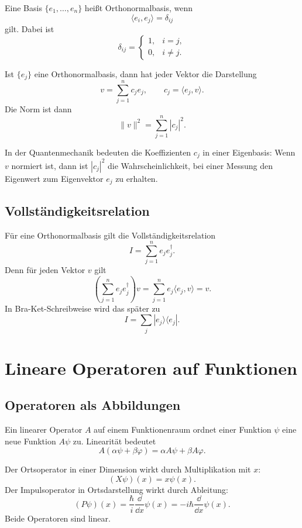 \begin{definitionbox}
Eine Basis $\{e_1,\dots,e_n\}$ heißt Orthonormalbasis, wenn
\[
    \langle e_i,e_j\rangle=\delta_{ij}
\]
gilt. Dabei ist
\[
    \delta_{ij}=\begin{cases}
    1,& i=j,\\
    0,& i\ne j.
    \end{cases}
\]
\end{definitionbox}

Ist $\{e_j\}$ eine Orthonormalbasis, dann hat jeder Vektor die Darstellung
\[
    v=\sum_{j=1}^{n} c_j e_j,
    \qquad c_j=\langle e_j,v\rangle.
\]
Die Norm ist dann
\[
    \|v\|^2=\sum_{j=1}^{n}|c_j|^2.
\]

\begin{conceptbox}
In der Quantenmechanik bedeuten die Koeffizienten $c_j$ in einer Eigenbasis: Wenn $v$ normiert ist, dann ist $|c_j|^2$ die Wahrscheinlichkeit, bei einer Messung den Eigenwert zum Eigenvektor $e_j$ zu erhalten.
\end{conceptbox}

\subsection{Vollständigkeitsrelation}

Für eine Orthonormalbasis gilt die Vollständigkeitsrelation
\[
    I=\sum_{j=1}^{n} e_j e_j^\dagger.
\]
Denn für jeden Vektor $v$ gilt
\[
    \left(\sum_{j=1}^{n} e_j e_j^\dagger\right)v
    =\sum_{j=1}^{n} e_j\langle e_j,v\rangle
    =v.
\]
In Bra-Ket-Schreibweise wird das später zu
\[
    I=\sum_j |e_j\rangle\langle e_j|.
\]

\section{Lineare Operatoren auf Funktionen}

\subsection{Operatoren als Abbildungen}

Ein linearer Operator $A$ auf einem Funktionenraum ordnet einer Funktion $\psi$ eine neue Funktion $A\psi$ zu. Linearität bedeutet
\[
    A(\alpha\psi+\beta\varphi)=\alpha A\psi+\beta A\varphi.
\]

\begin{examplebox}
Der Ortsoperator in einer Dimension wirkt durch Multiplikation mit $x$:
\[
    (X\psi)(x)=x\psi(x).
\]
Der Impulsoperator in Ortsdarstellung wirkt durch Ableitung:
\[
    (P\psi)(x)=\frac{\hbar}{i}\frac{\dd}{\dd x}\psi(x)
    =-i\hbar\frac{\dd}{\dd x}\psi(x).
\]
Beide Operatoren sind linear.
\end{examplebox}

